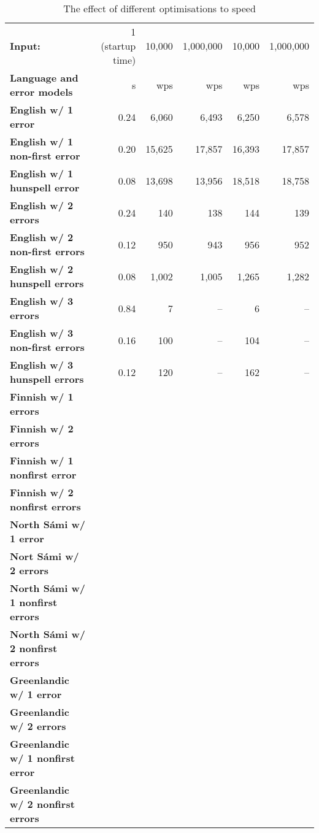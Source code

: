 \documentclass[a4paper,12pt]{article}
\begin{document}
\begin{table}
    \centering
    \begin{tabular}{|l|r||r|r|r|r|}
        \hline
        \bf Input: & 1 (startup time) & 10,000 & 1,000,000 & 10,000 & 1,000,000 \\
        \bf Language and error models & s & wps & wps & wps & wps \\
        \hline
        \bf English w/ 1 error     & 0.24  & 6,060  & 6,493  & 6,250  & 6,578 \\
 \bf English w/ 1 non-first error  & 0.20  & 15,625 & 17,857 & 16,393 & 17,857  \\
 \bf English w/ 1 hunspell error   & 0.08  & 13,698 & 13,956 & 18,518 & 18,758  \\
     \bf English w/ 2 errors       & 0.24  & 140   & 138   & 144   & 139  \\
 \bf English w/ 2 non-first errors & 0.12  & 950   & 943   & 956   & 952 \\
 \bf English w/ 2 hunspell errors  & 0.08  & 1,002 & 1,005 & 1,265 & 1,282 \\
   \bf English w/ 3 errors         & 0.84  & 7    &  --  &    6 & -- \\
 \bf English w/ 3 non-first errors & 0.16  & 100  &  --  &  104 & -- \\
 \bf English w/ 3 hunspell errors  & 0.12  & 120  &  --  &  162 & -- \\
        \hline
        \bf Finnish w/ 1 errors & & & & & \\
        \bf Finnish w/ 2 errors & & & & & \\
\bf Finnish w/ 1 nonfirst error & & & & & \\
        \bf Finnish w/ 2 nonfirst errors & & & & & \\
        \hline
        \bf North Sámi w/ 1 error & & & & & \\
        \bf Nort Sámi w/ 2 errors & & & & & \\
        \bf North Sámi w/ 1 nonfirst errors & & & & & \\
        \bf North Sámi w/ 2 nonfirst errors & & & & & \\
        \hline
        \bf Greenlandic w/ 1 error & & & & & \\
       \bf Greenlandic w/ 2 errors & & & & & \\
        \bf Greenlandic w/ 1 nonfirst error & & & & & \\
       \bf Greenlandic w/ 2 nonfirst errors & & & & & \\
        \hline
    \end{tabular}
    \caption{The effect of different optimisations to speed
    \label{table:optimisation-speed}}
\end{table}
\end{document}
